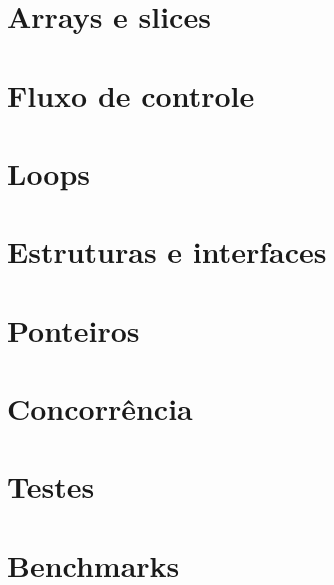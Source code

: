 \documentclass{apostila}
\begin{document}
\chapter{Arrays e slices}
\chapter{Fluxo de controle}
\chapter{Loops}
\chapter{Estruturas e interfaces}
\chapter{Ponteiros}
\chapter{Concorrência}
\chapter{Testes}
\chapter{Benchmarks}
\end{document}
